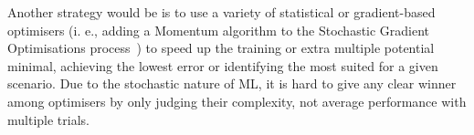 Another strategy would be is to use a variety of statistical or gradient-based optimisers (i. e., adding a Momentum algorithm to the Stochastic Gradient Optimisations process~\cite{xiao_accurate_2019}) to speed up the training or extra multiple potential minimal, achieving the lowest error or identifying the most suited for a given scenario.
Due to the stochastic nature of ML, it is hard to give any clear winner among optimisers by only judging their complexity, not average performance with multiple trials.
